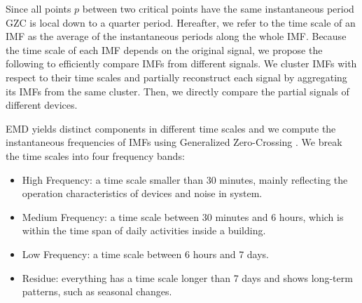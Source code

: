 Since all points $p$ between two critical points have the same instantaneous period GZC is local down to a quarter period.
Hereafter, we refer to the time scale of an IMF as the average of the instantaneous periods along the whole IMF.
Because the time scale of each IMF depends on the original signal, we propose the following to efficiently compare IMFs from different signals.
We cluster IMFs with respect to their time scales and partially reconstruct each signal by aggregating its IMFs from the 
same cluster.  Then, we directly compare the partial signals of different devices.

EMD yields distinct components in different time scales and we compute the instantaneous frequencies \cite{IF} of IMFs using Generalized Zero-Crossing \cite{GZC}.  We break the time scales into four frequency bands:
\begin{itemize}
\item High Frequency: a time scale smaller than 30 minutes, mainly reflecting the operation characteristics of devices and noise in system. 
\item Medium Frequency: a time scale between 30 minutes and 6 hours, which is within the time span of daily activities inside a building.
\item Low Frequency: a time scale between 6 hours and 7 days. %
\item Residue: everything has a time scale longer than 7 days and shows long-term patterns, such as seasonal changes.
\end{itemize}





